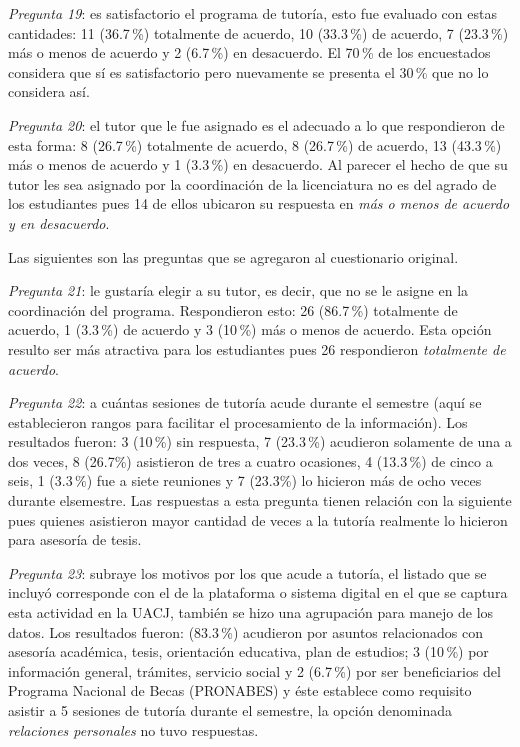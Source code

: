 \textit{Pregunta 19}: es satisfactorio el programa de tutoría, esto
fue evaluado con estas cantidades: 11 (36.7\,\%) totalmente de acuerdo, 10
(33.3\,\%) de acuerdo, 7 (23.3\,\%) más o menos de acuerdo y 2 (6.7\,\%) en
desa\-cuer\-do. El 70\,\% de los encuestados considera que sí es satisfactorio
pero nuevamente se presenta el 30\,\% que no lo considera así.


\textit{Pregunta 20}: el tutor que le fue asignado es el adecuado a lo que
respondieron de esta forma: 8 (26.7\,\%) totalmente de acuerdo, 8 (26.7\,\%) de
acuerdo, 13 (43.3\,\%) más o menos de acuerdo y 1 (3.3\,\%) en des\-acuer\-do. Al
parecer el hecho de que su tutor les sea asignado por la coordinación de la
licenciatura no es del agrado de los estudiantes pues 14 de ellos ubicaron
su respuesta en \textit{más o menos de acuerdo y en desacuerdo}.


\medskip
Las siguientes son las preguntas que se agregaron al cuestionario original.


\textit{Pregunta 21}: le gustaría elegir a su tutor, es decir, que no
se le asigne en la coordinación del programa. Respondieron esto: 26
(86.7\,\%) totalmente de acuerdo, 1 (3.3\,\%) de acuerdo y 3 (10\,\%) más o menos
de acuerdo. Esta opción resulto ser más atractiva para los estudiantes pues
26 respondieron \textit{totalmente de acuerdo}.

\enlargethispage{1\baselineskip}
\textit{Pregunta 22}: a cuántas sesiones de tutoría acude durante el
semestre (aquí se establecieron rangos para facilitar el procesamiento de
la información). Los resultados fueron: 3 (10\,\%) sin respuesta, 7 (23.3\,\%)
acudieron solamente de una a dos veces, 8 (26.7\%) asistieron de tres a
cuatro ocasiones, 4 (13.3\,\%)  de cinco a seis, 1 (3.3\,\%)  fue a siete
reuniones y 7 (23.3\%) lo hicieron más de ocho veces durante el\linebreak semestre.
Las respuestas a esta pregunta tienen  relación con la siguiente pues
quienes asistieron mayor cantidad de veces a la tutoría realmente lo
hicieron para asesoría de tesis.

\textit{Pregunta 23}: subraye los motivos por los que acude a tutoría,
el listado que se incluyó corresponde con el de la plataforma o sistema
digital en el que se captura esta actividad en la UACJ, también se hizo una
agrupación para manejo de los datos. Los resultados fueron: (83.3\,\%)
acudieron por asuntos relacionados con asesoría académica, tesis,
orientación educativa, plan de estudios; 3 (10\,\%) por información general,
trámites, servicio social y 2 (6.7\,\%) por ser beneficiarios del Programa
Nacional de Becas (PRONABES) y éste establece como requisito asistir a 5
sesiones de tutoría durante el semestre, la opción denominada
\textit{relaciones personales} no tuvo respuestas.


